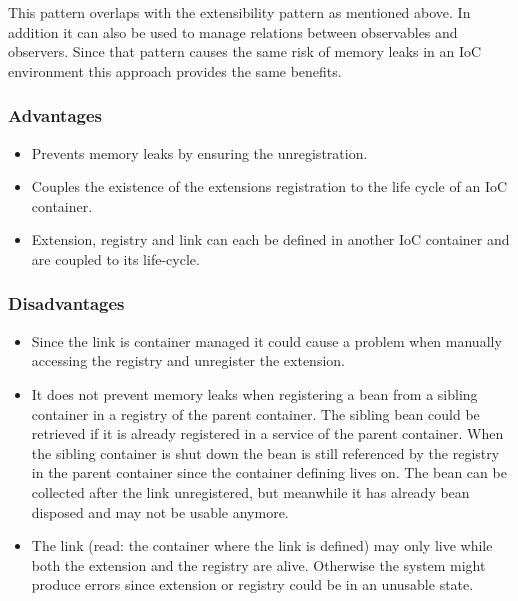 This pattern overlaps with the extensibility pattern as mentioned above. In addition it can also be used to manage relations between observables and observers. Since that pattern causes the same risk of memory leaks in an IoC environment this approach provides the same benefits. 

\subsubsection{Advantages}
\begin{itemize}
	\item Prevents memory leaks by ensuring the unregistration.
  \item Couples the existence of the extensions registration to the life cycle of an IoC container.
  \item Extension, registry and link can each be defined in another IoC container and are coupled to its life-cycle. 
\end{itemize}

\subsubsection{Disadvantages}
\begin{itemize}
	\item Since the link is container managed it could cause a problem when manually accessing the registry and unregister the extension.
  \item It does not prevent memory leaks when registering a bean from a sibling container in a registry of the parent container. The sibling bean could be retrieved if it is already registered in a service of the parent container. When the sibling container is shut down the bean is still referenced by the registry in the parent container since the container defining lives on. The bean can be collected after the link unregistered, but meanwhile it has already bean disposed and may not be usable anymore.
  \item The link (read: the container where the link is defined) may only live while both the extension and the registry are alive. Otherwise the system might produce errors since extension or registry could be in an unusable state. 
\end{itemize}